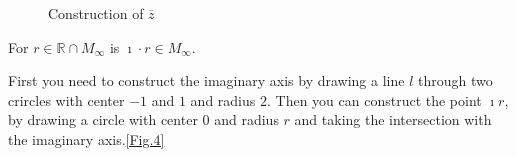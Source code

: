 \begin{figure}[h]
    \centering
    \caption{Construction of $\overline{z}$}
    \label{Fig.3}
\end{figure}


\begin{lemma}
    \label{lem:construction_imath_r}
    \leanok
    For $r \in \mathbb{R}\cap M_{\infty}$ is $\imath\cdot r \in M_{\infty}$.
\end{lemma}
First you need to construct the imaginary axis by drawing a line $l$ through two crircles with center $-1$ and $1$ and radius $2$. Then you can construct the point $\imath r$, by drawing a circle with center $0$ and radius $r$ and taking the intersection with the imaginary axis.\ref{Fig.4}
